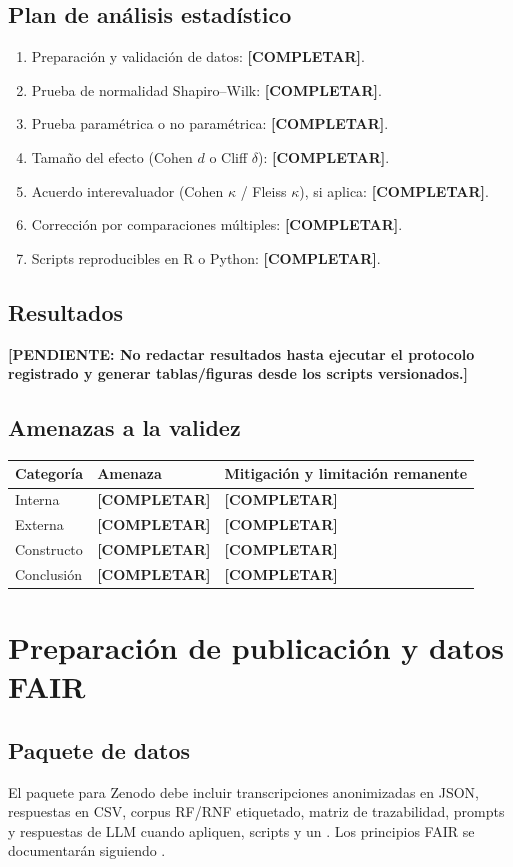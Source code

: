 \documentclass[12pt,journal,onecolumn]{IEEEtran}
\newcommand{\pendiente}[1]{\textcolor{red!70!black}{\textbf{[PENDIENTE: #1]}}}
\newcommand{\completar}{\textcolor{red!70!black}{\textbf{[COMPLETAR]}}}
\begin{document}
\subsection{Plan de análisis estadístico}
\begin{enumerate}
\item Preparación y validación de datos: \completar.
\item Prueba de normalidad Shapiro--Wilk: \completar.
\item Prueba paramétrica o no paramétrica: \completar.
\item Tamaño del efecto (Cohen $d$ o Cliff $\delta$): \completar.
\item Acuerdo interevaluador (Cohen $\kappa$ / Fleiss $\kappa$), si aplica: \completar.
\item Corrección por comparaciones múltiples: \completar.
\item Scripts reproducibles en R o Python: \completar.
\end{enumerate}

\subsection{Resultados}
\pendiente{No redactar resultados hasta ejecutar el protocolo registrado y generar tablas/figuras desde los scripts versionados.}

\subsection{Amenazas a la validez}
\begin{tabularx}{\textwidth}{P{0.18\textwidth}Y Y}\toprule
\textbf{Categoría} & \textbf{Amenaza} & \textbf{Mitigación y limitación remanente}\\\midrule
Interna & \completar & \completar\\
Externa & \completar & \completar\\
Constructo & \completar & \completar\\
Conclusión & \completar & \completar\\\bottomrule
\end{tabularx}

\section{Preparación de publicación y datos FAIR}
\subsection{Paquete de datos}
El paquete para Zenodo debe incluir transcripciones anonimizadas en JSON, respuestas en CSV, corpus RF/RNF etiquetado, matriz de trazabilidad, prompts y respuestas de LLM cuando apliquen, scripts y un . Los principios FAIR se documentarán siguiendo \cite{wilkinson2016fair}.
\end{document}

